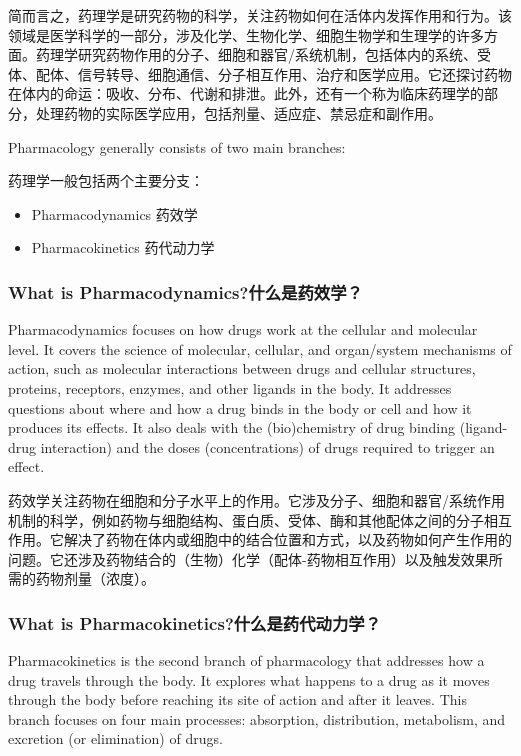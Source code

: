 \documentclass[dvipsnames, svgnames,a4paper,11pt]{article}
\begin{document}
简而言之，药理学是研究药物的科学，关注药物如何在活体内发挥作用和行为。该领域是医学科学的一部分，涉及化学、生物化学、细胞生物学和生理学的许多方面。药理学研究药物作用的分子、细胞和器官/系统机制，包括体内的系统、受体、配体、信号转导、细胞通信、分子相互作用、治疗和医学应用。它还探讨药物在体内的命运：吸收、分布、代谢和排泄。此外，还有一个称为临床药理学的部分，处理药物的实际医学应用，包括剂量、适应症、禁忌症和副作用。

Pharmacology generally consists of two main branches:

药理学一般包括两个主要分支：

\begin{itemize}

      \item Pharmacodynamics
            药效学

      \item Pharmacokinetics
            药代动力学

\end{itemize}
\subsubsection{What is Pharmacodynamics?什么是药效学？}

Pharmacodynamics focuses on how drugs work at the cellular and molecular level. It covers the science of molecular, cellular, and organ/system mechanisms of action, such as molecular interactions between drugs and cellular structures, proteins, receptors, enzymes, and other ligands in the body. It addresses questions about where and how a drug binds in the body or cell and how it produces its effects. It also deals with the (bio)chemistry of drug binding (ligand-drug interaction) and the doses (concentrations) of drugs required to trigger an effect.

药效学关注药物在细胞和分子水平上的作用。它涉及分子、细胞和器官/系统作用机制的科学，例如药物与细胞结构、蛋白质、受体、酶和其他配体之间的分子相互作用。它解决了药物在体内或细胞中的结合位置和方式，以及药物如何产生作用的问题。它还涉及药物结合的（生物）化学（配体-药物相互作用）以及触发效果所需的药物剂量（浓度）。

\subsubsection{What is Pharmacokinetics?什么是药代动力学？}
Pharmacokinetics is the second branch of pharmacology that addresses how a drug travels through the body. It explores what happens to a drug as it moves through the body before reaching its site of action and after it leaves. This branch focuses on four main processes: absorption, distribution, metabolism, and excretion (or elimination) of drugs.
\end{document}
